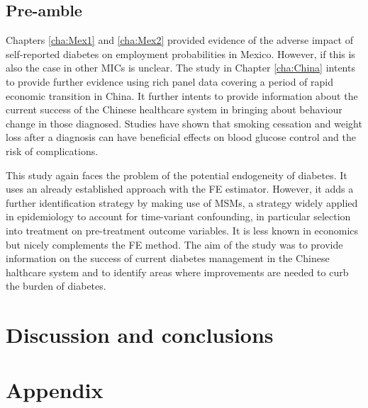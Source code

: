 \section*{Pre-amble}

Chapters \ref{cha:Mex1} and \ref{cha:Mex2} provided evidence of the adverse impact of self-reported diabetes on employment probabilities in Mexico. However, if this is also the case in other \acp{MIC} is unclear. The study in Chapter \ref{cha:China} intents to provide further evidence using rich panel data covering a period of rapid economic transition in China. It further intents to provide information about the current success of the Chinese healthcare system in bringing about behaviour change in those diagnosed. Studies have shown that smoking cessation and weight loss after a diagnosis can have beneficial effects on blood glucose control and the risk of complications.

This study again faces the problem of the potential endogeneity of diabetes. It uses an already established approach with the \ac{FE} estimator. However, it adds a further identification strategy by making use of \acp{MSM}, a strategy widely applied in epidemiology to account for time-variant confounding, in particular selection into treatment on pre-treatment outcome variables. It is less known in economics but nicely complements the \ac{FE} method. The aim of the study was to provide information on the success of current diabetes management in the Chinese halthcare system and to identify areas where improvements are needed to curb the burden of diabetes.

\chapter{\label{cha:Discussion}Discussion and conclusions} 

\chapter*{\label{cha:Appendix}Appendix}

\printbibliography

          
